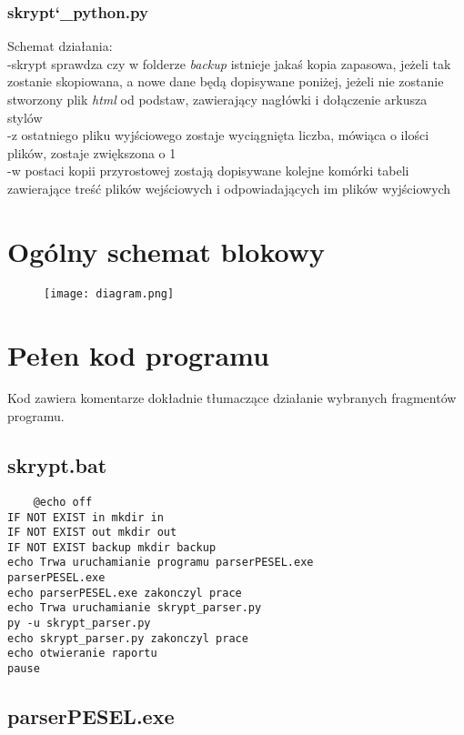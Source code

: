 \documentclass[12pt,a4paper]{article}
\begin{document}
	\subsubsection*{skrypt\char`_python.py}
Schemat działania:\\
-skrypt sprawdza czy w folderze \textit{backup}	istnieje jakaś kopia zapasowa, jeżeli tak zostanie skopiowana, a nowe dane będą dopisywane poniżej, jeżeli nie zostanie stworzony plik \textit{html} od podstaw, zawierający nagłówki i dołączenie arkusza stylów\\
-z ostatniego pliku wyjściowego zostaje wyciągnięta liczba, mówiąca o ilości plików, zostaje zwiększona o 1\\
-w postaci kopii przyrostowej zostają dopisywane kolejne komórki tabeli zawierające treść plików wejściowych i odpowiadających im plików wyjściowych\\

	\section*{Ogólny schemat blokowy}
	\begin{figure}[ht]
    	\centering
  		\texttt{[image: diagram.png]}    
    \end{figure}	

	\section*{Pełen kod programu}
Kod zawiera komentarze dokładnie tłumaczące działanie wybranych fragmentów programu.	
	\subsection*{skrypt.bat}
	
	\begin{verbatim}
	@echo off
IF NOT EXIST in mkdir in 
IF NOT EXIST out mkdir out
IF NOT EXIST backup mkdir backup
echo Trwa uruchamianie programu parserPESEL.exe
parserPESEL.exe
echo parserPESEL.exe zakonczyl prace
echo Trwa uruchamianie skrypt_parser.py
py -u skrypt_parser.py
echo skrypt_parser.py zakonczyl prace
echo otwieranie raportu
pause

	\end{verbatim}
	
	\subsection*{parserPESEL.exe}
	
\end{document}
